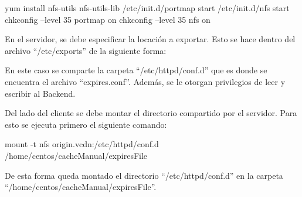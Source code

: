 \documentclass[12pt,a4paper,oneside]{book}
\begin{document}
\vspace{0.5cm}

\begin{origin}
yum install nfs-utils nfs-utils-lib
/etc/init.d/portmap start
/etc/init.d/nfs start
chkconfig --level 35 portmap on
chkconfig --level 35 nfs on
\end{origin}

\vspace{0.5cm}

En el servidor, se debe especificar la locación a exportar. Esto se hace dentro del archivo ``/etc/exports'' de la siguiente forma:


En este caso se comparte la carpeta ``/etc/httpd/conf.d'' que es donde se encuentra el archivo ``expires.conf''. Además, se le otorgan privilegios de leer y escribir al Backend.

\vspace{0.5cm}

Del lado del cliente se debe montar el directorio compartido por el servidor. Para esto se ejecuta primero el siguiente comando:

\vspace{0.5cm}

\begin{backend}
mount -t nfs origin.vcdn:/etc/httpd/conf.d /home/centos/cacheManual/expiresFile
\end{backend}

\vspace{0.5cm}

De esta forma queda montado el directorio ``/etc/httpd/conf.d'' en la carpeta ``/home/centos/cacheManual/expiresFile''. 

\vspace{0.5cm}


\end{document}
